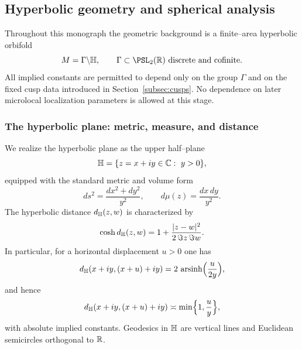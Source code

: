 
\subsection{Hyperbolic geometry and spherical analysis}\label{subsec:geometry}

Throughout this monograph the geometric background is a finite--area hyperbolic orbifold
\begin{equation}\label{eq:quotient-surface}
M=\Gamma\backslash\Hh,
\qquad
\Gamma\subset\PSL_2(\R)\ \text{discrete and cofinite}.
\end{equation}
All implied constants are permitted to depend only on the group $\Gamma$ and on the fixed cusp data
introduced in Section~\ref{subsec:cusps}. No dependence on later microlocal localization parameters
is allowed at this stage.

\subsubsection{The hyperbolic plane: metric, measure, and distance}

We realize the hyperbolic plane as the upper half--plane
\begin{equation}\label{eq:upper-half-plane}
\mathbb{H}=\{z=x+iy\in\mathbb{C}:\ y>0\},
\end{equation}
equipped with the standard metric and volume form
\begin{equation}\label{eq:hyp-metric-measure}
ds^{2}=\frac{dx^{2}+dy^{2}}{y^{2}},
\qquad
d\mu(z)=\frac{dx\,dy}{y^{2}}.
\end{equation}
The hyperbolic distance $d_{\mathbb{H}}(z,w)$ is characterized by
\begin{equation}\label{eq:cosh-distance}
\cosh d_{\mathbb{H}}(z,w)
=
1+\frac{|z-w|^{2}}{2\,\Im z\,\Im w}.
\end{equation}
In particular, for a horizontal displacement $u>0$ one has
\begin{equation}\label{eq:horizontal-distance}
d_{\mathbb{H}}(x+iy,(x+u)+iy)
=
2\,\mathop{\mathrm{arsinh}}\nolimits\!\Big(\frac{u}{2y}\Big),
\end{equation}
and hence
\begin{equation}\label{eq:horizontal-asymp}
d_{\mathbb{H}}(x+iy,(x+u)+iy)
\asymp
\min\Bigl\{1,\frac{u}{y}\Bigr\},
\end{equation}
with absolute implied constants. Geodesics in $\mathbb{H}$ are vertical lines and Euclidean semicircles
orthogonal to $\mathbb{R}$.

